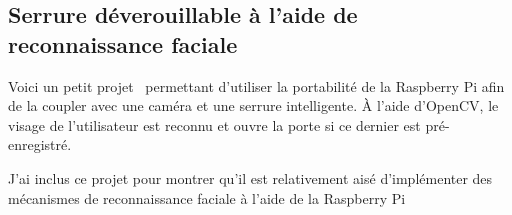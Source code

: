 \subsection{Serrure déverouillable à l'aide de reconnaissance faciale}
Voici un petit projet~\cite{DOORLOCK} permettant d'utiliser la portabilité de la Raspberry Pi afin de la coupler avec une caméra et une serrure intelligente. 
À l'aide d'OpenCV, le visage de l'utilisateur est reconnu et ouvre la porte si ce dernier est pré-enregistré. 

J'ai inclus ce projet pour montrer qu'il est relativement aisé d'implémenter des mécanismes de reconnaissance faciale à l'aide de la Raspberry Pi
